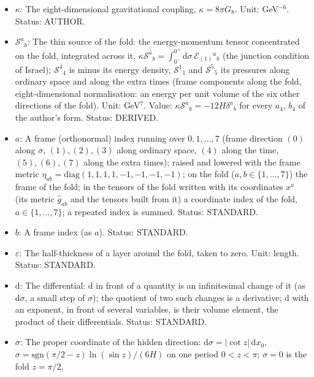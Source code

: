 \documentclass[
  10pt,
]{article}
\providecommand{\tightlist}{%
  \setlength{\itemsep}{0pt}\setlength{\parskip}{0pt}}
\begin{document}
\begin{itemize}
\tightlist
\item
  \(\kappa\): The eight-dimensional gravitational coupling,
  \(\kappa = 8\pi G_8\). Unit: GeV\(^{-6}\). Status: AUTHOR.
\item
  \(\mathcal{S}^a{}_b\): The thin source of the fold: the
  energy-momentum tensor concentrated on the fold, integrated across it,
  \(\kappa\mathcal{S}^a{}_b = \int_{0^-}^{0^+}\mathrm{d}\sigma\,\mathcal{E}_{(1)}{}^a{}_b\)
  (the junction condition of Israel); \(\mathcal{S}^4{}_4\) is minus its
  energy density, \(\mathcal{S}^1{}_1\) and \(\mathcal{S}^5{}_5\) its
  pressures along ordinary space and along the extra times (frame
  components along the fold, eight-dimensional normalisation: an energy
  per unit volume of the six other directions of the fold). Unit:
  GeV\(^7\). Value: \(\kappa\mathcal{S}^a{}_b = -12H\delta^a{}_b\) for
  every \(a_4\), \(b_4\) of the author's form. Status: DERIVED.
\item
  \(a\): A frame (orthonormal) index running over \(0, 1, \dots, 7\)
  (frame direction \((0)\) along \(\sigma\), \((1), (2), (3)\) along
  ordinary space, \((4)\) along the time, \((5), (6), (7)\) along the
  extra times); raised and lowered with the frame metric
  \(\eta_{ab} = \mathrm{diag}(1, 1, 1, 1, -1, -1, -1, -1)\); on the fold
  (\(a, b \in \{1, \dots, 7\}\)) the frame of the fold; in the tensors
  of the fold written with its coordinates \(x^a\) (its metric
  \(\hat g_{ab}\) and the tensors built from it) a coordinate index of
  the fold, \(a \in \{1, \dots, 7\}\); a repeated index is summed.
  Status: STANDARD.
\item
  \(b\): A frame index (as \(a\)). Status: STANDARD.
\item
  \(\varepsilon\): The half-thickness of a layer around the fold, taken
  to zero. Unit: length. Status: STANDARD.
\item
  \(\mathrm{d}\): The differential: \(\mathrm{d}\) in front of a
  quantity is an infinitesimal change of it (as \(\mathrm{d}\sigma\), a
  small step of \(\sigma\)); the quotient of two such changes is a
  derivative; \(\mathrm{d}\) with an exponent, in front of several
  variables, is their volume element, the product of their
  differentials. Status: STANDARD.
\item
  \(\sigma\): The proper coordinate of the hidden direction:
  \(\mathrm{d}\sigma = \lvert\cot z\rvert\,\mathrm{d}x_0\),
  \(\sigma = \mathrm{sgn}(\pi/2 - z)\ln(\sin z)/(6H)\) on one period
  \(0 < z < \pi\); \(\sigma = 0\) is the fold \(z = \pi/2\),

\end{itemize}
\end{document}
